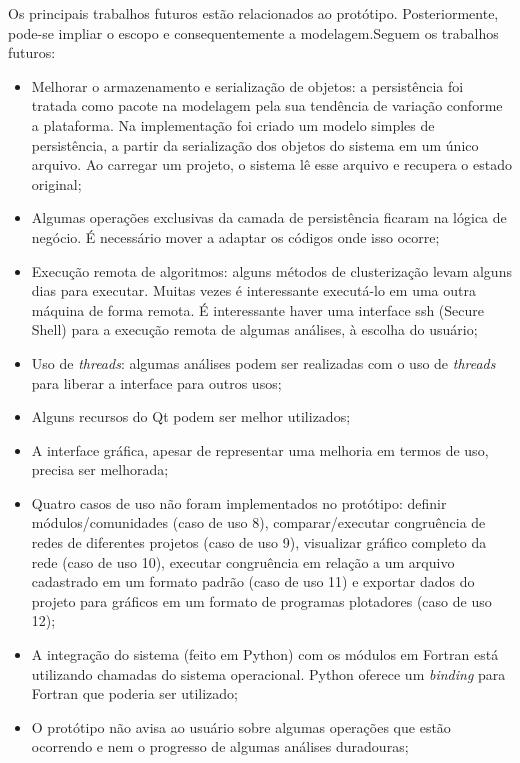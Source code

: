 Os principais trabalhos futuros estão relacionados ao protótipo. Posteriormente, pode-se impliar o escopo e consequentemente a modelagem.Seguem os trabalhos
futuros:

\begin{itemize}
  \item{Melhorar o armazenamento e serialização de objetos: a persistência foi tratada como pacote na modelagem pela sua tendência de variação conforme
a plataforma. Na implementação foi criado um modelo simples de persistência, a partir da serialização dos objetos do sistema em um único arquivo. Ao
carregar um projeto, o sistema lê esse arquivo e recupera o estado original;}
  \item{Algumas operações exclusivas da camada de persistência ficaram na lógica de negócio. É necessário mover a adaptar os códigos onde isso ocorre;}
  \item{Execução remota de algoritmos: alguns métodos de clusterização levam alguns dias para executar. Muitas vezes é interessante executá-lo em uma outra
máquina de forma remota. É interessante haver uma interface ssh (Secure Shell) para a execução remota de algumas análises, à escolha do usuário;}
  \item{Uso de \textit{threads}: algumas análises podem ser realizadas com o uso de \textit{threads} para liberar a interface para outros usos;}
  \item{Alguns recursos do Qt podem ser melhor utilizados;}
  \item{A interface gráfica, apesar de representar uma melhoria em termos de uso, precisa ser melhorada;}
  \item{Quatro casos de uso não foram implementados no protótipo: definir módulos/comunidades (caso de uso 8), comparar/executar congruência de redes de
diferentes projetos (caso de uso 9), visualizar gráfico completo da rede (caso de uso 10), executar congruência em relação a um arquivo cadastrado em um
formato padrão (caso de uso 11) e exportar dados do projeto para gráficos em um formato de programas plotadores (caso de uso 12);}
  \item{A integração do sistema (feito em Python) com os módulos em Fortran está utilizando chamadas do sistema operacional. Python oferece um
\textit{binding} para Fortran que poderia ser utilizado;}
  \item{O protótipo não avisa ao usuário sobre algumas operações que estão ocorrendo e nem o progresso de algumas análises duradouras;}
\end{itemize}

